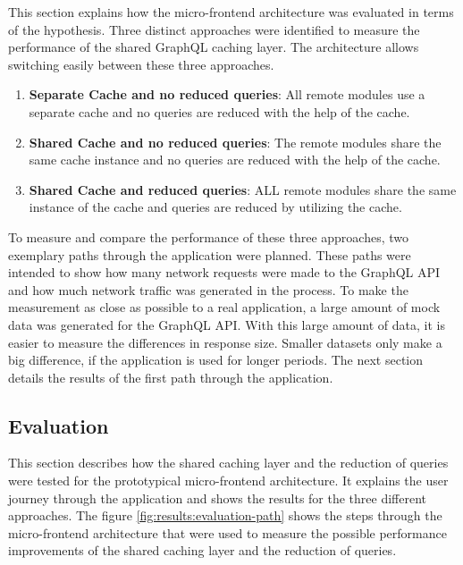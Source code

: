 This section explains how the micro-frontend architecture was evaluated in terms of the hypothesis. Three distinct approaches were identified to measure the performance of the shared GraphQL caching layer. The architecture allows switching easily between these three approaches.

\begin{enumerate}
  \item \textbf{Separate Cache and no reduced queries}: All remote modules use a separate cache and no queries are reduced with the help of the cache.
  \item \textbf{Shared Cache and no reduced queries}: The remote modules share the same cache instance and no queries are reduced with the help of the cache.
  \item \textbf{Shared Cache and reduced queries}: ALL remote modules share the same instance of the cache and queries are reduced by utilizing the cache.
\end{enumerate}

\noindent To measure and compare the performance of these three approaches, two exemplary paths through the application were planned. These paths were intended to show how many network requests were made to the GraphQL \ac{API} and how much network traffic was generated in the process. To make the measurement as close as possible to a real application, a large amount of mock data was generated for the GraphQL \ac{API}. With this large amount of data, it is easier to measure the differences in response size. Smaller datasets only make a big difference, if the application is used for longer periods. The next section details the results of the first path through the application.

\subsection{Evaluation}\label{subsection:results:performance-measurement:evaluation}

This section describes how the shared caching layer and the reduction of queries were tested for the prototypical micro-frontend architecture. It explains the user journey through the application and shows the results for the three different approaches. The figure \ref{fig:results:evaluation-path} shows the steps through the micro-frontend architecture that were used to measure the possible performance improvements of the shared caching layer and the reduction of queries.

